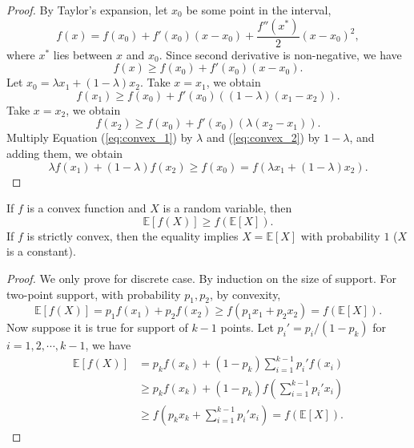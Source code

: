 \begin{proof}

By Taylor's expansion, let $x_0$ be some point in the interval,
\[
	f(x) = f(x_0) + f'(x_0) (x-x_0) + \frac{f''(x^*)}{2}(x-x_0)^2,
\]
where $x^*$ lies between $x$ and $x_0$. Since second derivative is non-negative, we have
\[
	f(x) \geq f(x_0) + f'(x_0)(x-x_0).
\]
Let $x_0=\lambda x_1 + (1-\lambda)x_2$. Take $x = x_1$, we obtain
\begin{equation}
\label{eq:convex_1}
	f(x_1) \geq f(x_0) + f'(x_0)((1-\lambda)(x_1-x_2)).
\end{equation}
Take $x=x_2$, we obtain
\begin{equation}
\label{eq:convex_2}
	f(x_2) \geq f(x_0) + f'(x_0)(\lambda(x_2-x_1)).
\end{equation}
Multiply Equation (\ref{eq:convex_1}) by $\lambda$ and (\ref{eq:convex_2}) by $1-\lambda$, and adding them, we obtain
\[
	\lambda f(x_1) + (1-\lambda)f(x_2) \geq f(x_0) = f(\lambda x_1 + (1-\lambda)x_2).
\]

\end{proof}

\begin{theorem}
If $f$ is a convex function and $X$ is a random variable, then
\[
	\mathbb{E}[f(X)] \geq f(\mathbb{E}[X]).
\]
If $f$ is strictly convex, then the equality implies $X = \mathbb{E}[X]$ with probability $1$ ($X$ is a constant).
\end{theorem}

\begin{proof}

We only prove for discrete case. By induction on the size of support. For two-point support, with probability $p_1,p_2$, by convexity,
\[
	\mathbb{E}[f(X)] = p_1 f(x_1) + p_2 f(x_2) \geq f(p_1x_1 + p_2 x_2) = f(\mathbb{E}[X]).
\]
Now suppose it is true for support of $k-1$ points. Let $p_i' = p_i/(1-p_k)$ for $i = 1, 2, \cdots, k-1$, we have
\[
\begin{aligned}
	\mathbb{E}[f(X)]
	&= p_k f(x_k) + (1- p_k) \sum_{i=1}^{k-1}p_i'f(x_i) \\
	&\geq p_k f(x_k) + (1- p_k) f\left( \sum_{i=1}^{k-1}p_i'x_i \right) \\
	&\geq f\left(p_k x_k + \sum_{i=1}^{k-1}p_i'x_i \right) = f(\mathbb{E}[X]).
\end{aligned}
\]

\end{proof}


